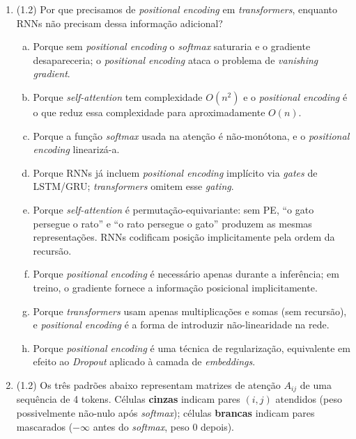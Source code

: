 \documentclass[11pt,a4paper]{article}
\begin{document}
\begin{enumerate}[1)]
\item (1.2) Por que precisamos de \textit{positional encoding} em \textit{transformers}, enquanto RNNs não precisam dessa informação adicional?
\begin{enumerate}[a)]
    \item Porque sem \textit{positional encoding} o \textit{softmax} saturaria e o gradiente desapareceria; o \textit{positional encoding} ataca o problema de \textit{vanishing gradient}.
    \item Porque \textit{self-attention} tem complexidade $O(n^2)$ e o \textit{positional encoding} é o que reduz essa complexidade para aproximadamente $O(n)$.
    \item Porque a função \textit{softmax} usada na atenção é não-monótona, e o \textit{positional encoding} linearizá-a.
    \item Porque RNNs já incluem \textit{positional encoding} implícito via \textit{gates} de LSTM/GRU; \textit{transformers} omitem esse \textit{gating}.
    \item Porque \textit{self-attention} é permutação-equivariante: sem PE, ``o gato persegue o rato'' e ``o rato persegue o gato'' produzem as mesmas representações. RNNs codificam posição implicitamente pela ordem da recursão.
    \item Porque \textit{positional encoding} é necessário apenas durante a inferência; em treino, o gradiente fornece a informação posicional implicitamente.
    \item Porque \textit{transformers} usam apenas multiplicações e somas (sem recursão), e \textit{positional encoding} é a forma de introduzir não-linearidade na rede.
    \item Porque \textit{positional encoding} é uma técnica de regularização, equivalente em efeito ao \textit{Dropout} aplicado à camada de \textit{embeddings}.
\end{enumerate}

\item (1.2) Os três padrões abaixo representam matrizes de atenção $A_{ij}$ de uma sequência de 4 tokens. Células \textbf{cinzas} indicam pares $(i, j)$ atendidos (peso possivelmente não-nulo após \textit{softmax}); células \textbf{brancas} indicam pares mascarados ($-\infty$ antes do \textit{softmax}, peso 0 depois).


\end{enumerate}
\end{document}
